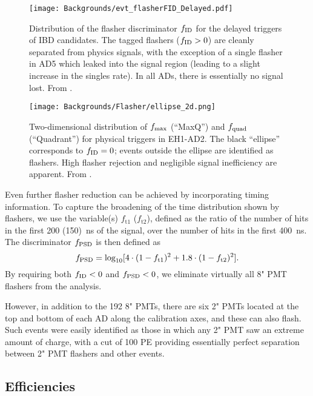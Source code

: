 \documentclass[../thesis.tex]{subfiles}
\begin{document}
\begin{figure}[h]
  \texttt{[image: Backgrounds/evt\_flasherFID\_Delayed.pdf]}
  \caption{Distribution of the flasher discriminator $f_{\mathrm{ID}}$ for the delayed triggers of IBD candidates. The tagged flashers ($f_{\mathrm{ID}} > 0$) are cleanly separated from physics signals, with the exception of a single flasher in AD5 which leaked into the signal region (leading to a slight increase in the singles rate). In all ADs, there is essentially no signal lost. From \cite{An_2017}.}
  \label{fig:fID_dist}
\end{figure}

\begin{figure}[ht!]
  \texttt{[image: Backgrounds/Flasher/ellipse\_2d.png]}
  \caption{Two-dimensional distribution of $f_{\mathrm{max}}$ (``MaxQ'') and $f_{\mathrm{quad}}$ (``Quadrant'') for physical triggers in EH1-AD2. The black ``ellipse'' corresponds to $f_{\mathrm{ID}} = 0$; events outside the ellipse are identified as flashers. High flasher rejection and negligible signal inefficiency are apparent. From \cite{flasherControl}.}
  \label{fig:bkgFlasherEllipse2D}
\end{figure}

Even further flasher reduction can be achieved by incorporating timing information. To capture the broadening of the time distribution shown by flashers, we use the variable(s) $f_{\mathrm{t}1}$ ($f_{\mathrm{t}2}$), defined as the ratio of the number of hits in the first 200 (150)~ns of the signal, over the number of hits in the first 400~ns. The discriminator $f_{\mathrm{PSD}}$ is then defined as
\begin{equation}
  f_{\mathrm{PSD}} = \log_{10} [4 \cdot (1 - f_{\mathrm{t}1})^2 + 1.8 \cdot (1 - f_{\mathrm{t}2})^2].
\end{equation}
By requiring both $f_{\mathrm{ID}} < 0$ and $f_{\mathrm{PSD}} < 0$, we eliminate virtually all 8" PMT flashers from the analysis.

However, in addition to the 192 8" PMTs, there are six 2" PMTs located at the top and bottom of each AD along the calibration axes, and these can also flash. Such events were easily identified as those in which any 2" PMT saw an extreme amount of charge, with a cut of 100 PE providing essentially perfect separation between 2" PMT flashers and other events.

\subsection{Efficiencies}
\label{sec:bkgFlasherEffs}
\end{document}
